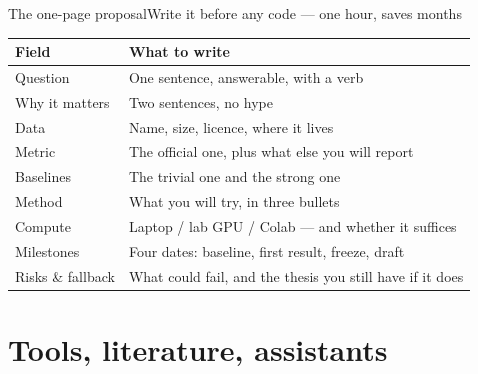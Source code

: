 \documentclass[aspectratio=169,11pt]{beamer}
\begin{document}
\begin{frame}{The one-page proposal}{Write it before any code --- one hour, saves months}
\footnotesize
\begin{tabularx}{\textwidth}{>{\raggedright\arraybackslash}p{3.4cm} X}
\toprule
\textbf{\color{brand}Field} & \textbf{\color{brand}What to write} \\
\midrule
\rowcolor{rowtint} Question & One sentence, answerable, with a verb \\
Why it matters & Two sentences, no hype \\
\rowcolor{rowtint} Data & Name, size, licence, where it lives \\
Metric & The official one, plus what else you will report \\
\rowcolor{rowtint} Baselines & The trivial one and the strong one \\
Method & What you will try, in three bullets \\
\rowcolor{rowtint} Compute & Laptop / lab GPU / Colab --- and whether it suffices \\
Milestones & Four dates: baseline, first result, freeze, draft \\
\rowcolor{rowtint} Risks \& fallback & What could fail, and the thesis you still have if it does \\
\bottomrule
\end{tabularx}
\end{frame}

\section{Tools, literature, assistants}
\end{document}
